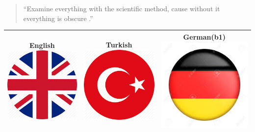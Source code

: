 

\begin{quote}
``Examine everything with the scientific method, cause without it everything is obscure .''
\end{quote}


\newline

\begin{tabular}{ |c|c|c| } \hline
 English{\includegraphics[scale=0.05]{eng.jpeg}} 
 &Turkish{\includegraphics[scale=0.05]{tr.png}}& German\hspace{2pt}(b1){\includegraphics[scale=0.05]{deu.jpeg}}\\ 
 \hline
\end{tabular}\newline


